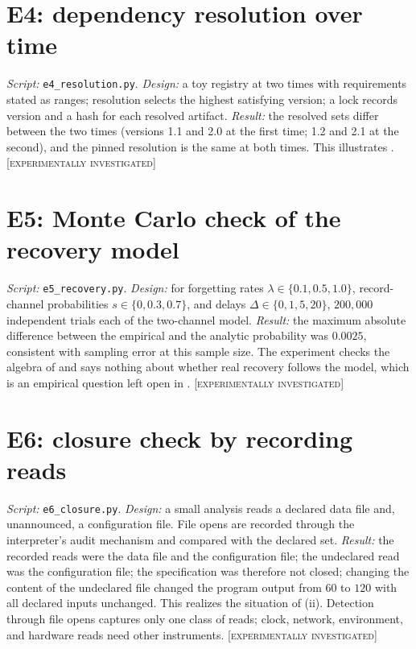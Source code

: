 \documentclass[11pt,twoside,openright]{book}
\theoremstyle{plain}
\theoremstyle{definition}
\theoremstyle{remark}
\newcommand{\Tested}{\textup{\textsc{[experimentally investigated]}}}
\begin{document}
\section{E4: dependency resolution over time}

\emph{Script:} \texttt{e4\_resolution.py}. \emph{Design:} a toy registry at two times with requirements stated as ranges; resolution selects the highest satisfying version; a lock records version and a hash for each resolved artifact. \emph{Result:} the resolved sets differ between the two times (versions 1.1 and 2.0 at the first time; 1.2 and 2.1 at the second), and the pinned resolution is the same at both times. This illustrates . \Tested{}

\section{E5: Monte Carlo check of the recovery model}

\emph{Script:} \texttt{e5\_recovery.py}. \emph{Design:} for forgetting rates $\lambda\in\{0.1,0.5,1.0\}$, record-channel probabilities $s\in\{0,0.3,0.7\}$, and delays $\Delta\in\{0,1,5,20\}$, $200{,}000$ independent trials each of the two-channel model. \emph{Result:} the maximum absolute difference between the empirical and the analytic probability was $0.0025$, consistent with sampling error at this sample size. The experiment checks the algebra of  and says nothing about whether real recovery follows the model, which is an empirical question left open in . \Tested{}

\section{E6: closure check by recording reads}

\emph{Script:} \texttt{e6\_closure.py}. \emph{Design:} a small analysis reads a declared data file and, unannounced, a configuration file. File opens are recorded through the interpreter's audit mechanism and compared with the declared set. \emph{Result:} the recorded reads were the data file and the configuration file; the undeclared read was the configuration file; the specification was therefore not closed; changing the content of the undeclared file changed the program output from $60$ to $120$ with all declared inputs unchanged. This realizes the situation of (ii). Detection through file opens captures only one class of reads; clock, network, environment, and hardware reads need other instruments. \Tested{}
\end{document}
